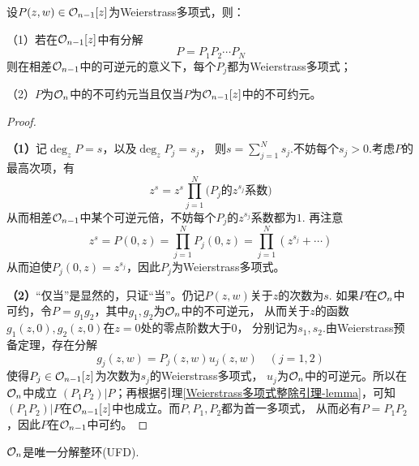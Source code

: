 \begin{lemma}设$P(z,w)\in\mathcal{O}_{n-1}[z]$为Weierstrass多项式，则：

（1）若在$\mathcal{O}_{n-1}[z]$中有分解
$$P=P_1P_2\cdots P_N$$
则在相差$\mathcal{O}_{n-1}$中的可逆元的意义下，每个$P_j$都为Weierstrass多项式；

（2）$P$为$\mathcal{O}_n$中的不可约元当且仅当$P$为$\mathcal{O}_{n-1}[z]$中的不可约元。
\label{解析函数芽UFD-引理}
\end{lemma}

\begin{proof}$\,$

\textbf{（1）}记$\deg_z P=s$，以及$\deg_z P_j=s_j$，
则$s=\sum\limits_{j=1}^Ns_j$.不妨每个$s_j>0$.考虑$P$的最高次项，有
$$
  z^s=z^s\prod_{j=1}^N\big(\text{$P_j$的$z^{s_j}$系数}\big)
$$
从而相差$\mathcal{O}_{n-1}$中某个可逆元倍，不妨每个$P_j$的$z^{s_j}$系数都为$1$.
再注意
$$z^{s}=P(0,z)=\prod_{j=1}^NP_j(0,z)
=\prod_{j=1}^N(z^{s_j}+\cdots)$$
从而迫使$P_j(0,z)=z^{s_j}$，因此$P_j$为Weierstrass多项式。

\textbf{（2）}“仅当”是显然的，只证“当”。仍记$P(z,w)$关于$z$的次数为$s$.
如果$P$在$\mathcal{O}_n$中可约，令$P=g_1g_2$，其中$g_1,g_2$为$\mathcal{O}_{n}$中的不可逆元，
从而关于$z$的函数$g_1(z,0),g_2(z,0)$在$z=0$处的零点阶数大于$0$，
分别记为$s_1,s_2$.由Weierstrass预备定理，存在分解
$$g_j(z,w)=P_j(z,w)u_j(z,w)\quad (j=1,2)$$
使得$P_j\in\mathcal{O}_{n-1}[z]$为次数为$s_j$的Weierstrass多项式，
$u_j$为$\mathcal{O}_n$中的可逆元。所以在$\mathcal{O}_n$中成立
$(P_1P_2)|P$；再根据引理\ref{Weierstrass多项式整除引理-lemma}，可知
$(P_1P_2)|P$在$\mathcal{O}_{n-1}[z]$中也成立。而$P,P_1,P_2$都为首一多项式，
从而必有$P=P_1P_2$，因此$P$在$\mathcal{O}_{n-1}$中可约。
\end{proof}

\begin{thm}
$\mathcal{O}_n$是唯一分解整环(UFD).
\end{thm}

